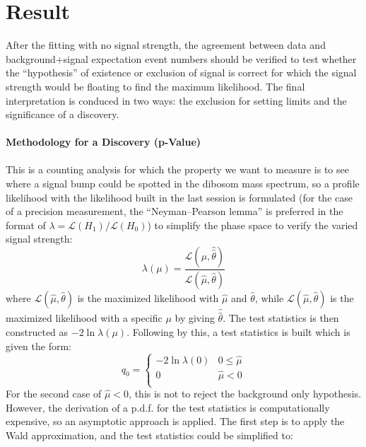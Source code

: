 \section{Result}
After the fitting with no signal strength, the agreement between data and background+signal expectation event numbers should be verified to test whether the ``hypothesis'' of existence or exclusion of signal is correct for which the signal strength would be floating to find the maximum likelihood. The final interpretation is conduced in two ways: the exclusion for setting limits and the significance of a discovery. 
\\
\\{\bf Methodology for a Discovery (p-Value)}
\\
\\This is a counting analysis for which the property we want to measure is to see where a signal bump could be spotted in the dibosom mass spectrum, so a profile likelihood with the likelihood built in the last session is formulated\cite{profile1,profile2} (for the case of a precision measurement, the ``Neyman–Pearson lemma'' is preferred in the format of $\lambda=\mathcal{L}(H_{1})/\mathcal{L}(H_0)$\cite{pn}) to simplify the phase space to verify the varied signal strength:
\begin{equation}
\lambda(\mu) = \frac{\mathcal{L}(\mu,\hat{\hat{\theta}})}{\mathcal{L}(\hat{\mu},\hat{\theta})}
\end{equation}
where $\mathcal{L}(\hat{\mu},\hat{\theta})$ is the maximized likelihood with $\hat{\mu}$ and $\hat{\theta}$, while $\mathcal{L}(\hat{\mu},\hat{\theta})$ is the maximized likelihood with a specific $\mu$ by giving $\hat{\hat{\theta}}$. The test statistics is then constructed as $-2\ln{\lambda(\mu)}$. Following by this, a test statistics\cite{teststats} is built which is given the form:
\begin{equation}
\label{Eq:testPvalue}
q_{0} = 
\begin{cases}
-2 \ln \lambda(0) & 0 \le \hat{\mu} \\
0 & \hat{\mu} < 0 \\
\end{cases}
\end{equation}
\noindent
For the second case of $\hat{\mu}<0$, this is not to reject the background only hypothesis. However, the derivation of a p.d.f. for the test statistics is computationally expensive, so an asymptotic approach is applied. The first step is to apply the Wald approximation, and the test statistics could be simplified to:
